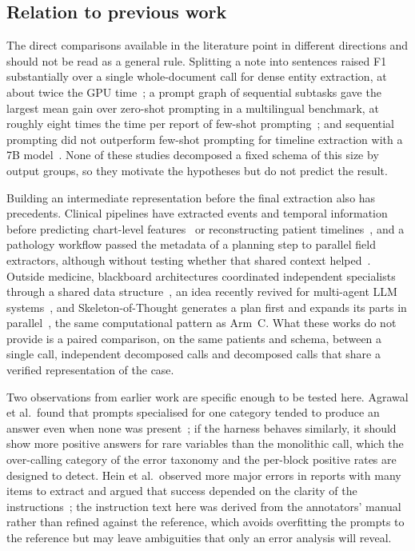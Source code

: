 \subsection{Relation to previous work}

The direct comparisons available in the literature point in different directions and should not be read
as a general rule. Splitting a note into sentences raised F1 substantially over a single whole-document call
for dense entity extraction, at about twice the GPU time~\cite{llmie2025}; a prompt graph of sequential
subtasks gave the largest mean gain over zero-shot prompting in a multilingual benchmark, at roughly eight
times the time per report of few-shot prompting~\cite{spaanderman2025structured}; and sequential prompting did
not outperform few-shot prompting for timeline extraction with a 7B model~\cite{fornasiere2024medical}. None of
these studies decomposed a fixed schema of this size by output groups, so they motivate the hypotheses but do
not predict the result. 

Building an intermediate representation before the final extraction also has precedents. Clinical pipelines
have extracted events and temporal information before predicting chart-level features~\cite{psych2stage2026}
or reconstructing patient timelines~\cite{clinicirca2026}, and a pathology workflow passed the metadata of a planning step to parallel field extractors, although
without testing whether that shared context helped~\cite{promptplanextract2026}. Outside medicine, blackboard architectures
coordinated independent specialists through a shared data structure~\cite{erman1980hearsay,nii1986blackboard},
an idea recently revived for multi-agent LLM systems~\cite{blackboardllm2025,blackboardmas2025}, and
Skeleton-of-Thought generates a plan first and expands its parts in parallel~\cite{skeletonofthought2024}, the
same computational pattern as Arm~C. What these works do not provide is a paired comparison, on the same
patients and schema, between a single call, independent decomposed calls and decomposed calls that share a
verified representation of the case.

Two observations from earlier work are specific enough to be tested here. Agrawal et al.\ found that prompts
specialised for one category tended to produce an answer even when none was present~\cite{agrawal2022fewshot};
if the harness behaves similarly, it should show more positive answers for rare variables than the monolithic
call, which the over-calling category of the error taxonomy and the per-block positive rates are designed to
detect. Hein et al.\ observed more major errors in reports with many items to extract and argued that success
depended on the clarity of the instructions~\cite{iterativerefine2025}; the instruction text here was derived
from the annotators' manual rather than refined against the reference, which avoids overfitting the prompts
to the reference but may leave ambiguities that only an error analysis will reveal.

